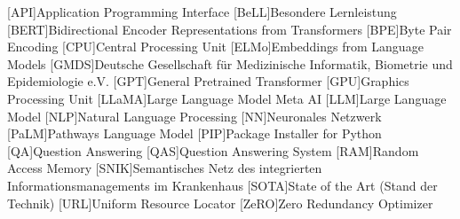 \begin{acronym}[SPARQL]
    [API]{Application Programming Interface}
    [BeLL]{Besondere Lernleistung}
    [BERT]{Bidirectional Encoder Representations from Transformers}
    [BPE]{Byte Pair Encoding}
    [CPU]{Central Processing Unit}
    [ELMo]{Embeddings from Language Models}
    [GMDS]{Deutsche Gesellschaft für Medizinische Informatik, Biometrie und Epidemiologie e.V.}
    [GPT]{General Pretrained Transformer}
    [GPU]{Graphics Processing Unit}
    [LLaMA]{Large Language Model Meta AI}
    [LLM]{Large Language Model}
    [NLP]{Natural Language Processing}
    [NN]{Neuronales Netzwerk}
    [PaLM]{Pathways Language Model}
    [PIP]{Package Installer for Python}
    [QA]{Question Answering}
    [QAS]{Question Answering System}
    [RAM]{Random Access Memory}
    [SNIK]{Semantisches Netz des integrierten Informationsmanagements im Krankenhaus}
    [SOTA]{State of the Art (Stand der Technik)}
    [URL]{Uniform Resource Locator}
    [ZeRO]{Zero Redundancy Optimizer}
\end{acronym}
